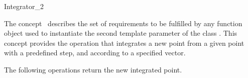 

\begin{ccRefFunctionObjectConcept}{Integrator_2}


\ccDefinition
  
The concept \ccRefName\ describes the set of requirements to be
fulfilled by any function object used to instantiate the second
template parameter of the class
.  This concept provides
the operation that integrates a new point from a given point with a
predefined step, and according to a specified vector.


\ccTypes
{}
\ccGlue
{}
\ccGlue
{}
\ccGlue

\ccCreation
{}  %
\ccGlue

\ccOperations
{}
The following operations return the new integrated point.
\ccGlue
{}
\ccGlue

\ccHasModels
{} \\
 \\
\end{ccRefFunctionObjectConcept}


